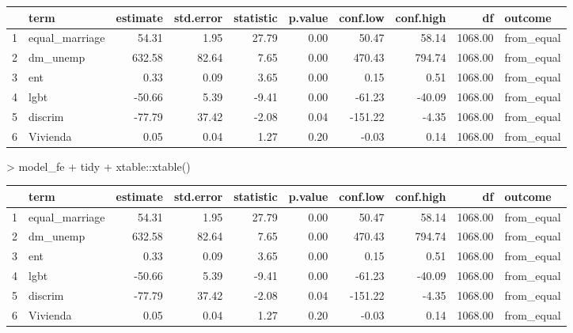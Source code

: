 \begin{table}[ht]
    \centering
    \begin{tabular}{rlrrrrrrrl}
      \hline
     & term & estimate & std.error & statistic & p.value & conf.low & conf.high & df & outcome \\ 
      \hline
    1 & equal\_marriage & 54.31 & 1.95 & 27.79 & 0.00 & 50.47 & 58.14 & 1068.00 & from\_equal \\ 
      2 & dm\_unemp & 632.58 & 82.64 & 7.65 & 0.00 & 470.43 & 794.74 & 1068.00 & from\_equal \\ 
      3 & ent & 0.33 & 0.09 & 3.65 & 0.00 & 0.15 & 0.51 & 1068.00 & from\_equal \\ 
      4 & lgbt & -50.66 & 5.39 & -9.41 & 0.00 & -61.23 & -40.09 & 1068.00 & from\_equal \\ 
      5 & discrim & -77.79 & 37.42 & -2.08 & 0.04 & -151.22 & -4.35 & 1068.00 & from\_equal \\ 
      6 & Vivienda & 0.05 & 0.04 & 1.27 & 0.20 & -0.03 & 0.14 & 1068.00 & from\_equal \\ 
       \hline
    \end{tabular}
    \end{table}
    > model_fe %
    +     tidy %
    +     xtable::xtable()
    \begin{table}[ht]
    \centering
    \begin{tabular}{rlrrrrrrrl}
      \hline
     & term & estimate & std.error & statistic & p.value & conf.low & conf.high & df & outcome \\ 
      \hline
    1 & equal\_marriage & 54.31 & 1.95 & 27.79 & 0.00 & 50.47 & 58.14 & 1068.00 & from\_equal \\ 
      2 & dm\_unemp & 632.58 & 82.64 & 7.65 & 0.00 & 470.43 & 794.74 & 1068.00 & from\_equal \\ 
      3 & ent & 0.33 & 0.09 & 3.65 & 0.00 & 0.15 & 0.51 & 1068.00 & from\_equal \\ 
      4 & lgbt & -50.66 & 5.39 & -9.41 & 0.00 & -61.23 & -40.09 & 1068.00 & from\_equal \\ 
      5 & discrim & -77.79 & 37.42 & -2.08 & 0.04 & -151.22 & -4.35 & 1068.00 & from\_equal \\ 
      6 & Vivienda & 0.05 & 0.04 & 1.27 & 0.20 & -0.03 & 0.14 & 1068.00 & from\_equal \\ 
       \hline
    \end{tabular}
    \end{table}